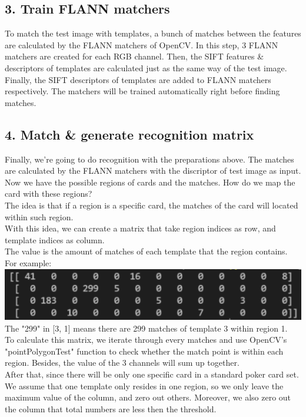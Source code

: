 \documentclass{article}
\begin{document}
\subsection*{3. Train FLANN matchers}

To match the test image with templates, a bunch of matches between the features are calculated by the FLANN matchers of OpenCV. In this step, 3 FLANN matchers are created for each RGB channel. Then, the SIFT features \& descriptors of templates are calculated just as the same way of the test image. Finally, the SIFT descriptors of templates are added to FLANN matchers respectively. The matchers will be trained automatically right before finding matches.

\subsection*{4. Match \& generate recognition matrix}

Finally, we're going to do recognition with the preparations above. The matches are calculated by the FLANN matchers with the discriptor of test image as input.\\
Now we have the possible regions of cards and the matches. How do we map the card with these regions?\\
The idea is that if a region is a specific card, the matches of the card will located within such region.\\
With this idea, we can create a matrix that take region indices as row, and template indices as column.\\
The value is the amount of matches of each template that the region contains.\\
For example:\\
\includegraphics{matrix.png}\\
The "299" in [3, 1] means there are 299 matches of template 3 within region 1.\\
To calculate this matrix, we iterate through every matches and use OpenCV's "pointPolygonTest" function to check whether the match point is within each region. Besides, the value of the 3 channels will sum up together.\\
After that, since there will be only one specific card in a standard poker card set. We assume that one template only resides in one region, so we only leave the maximum value of the column, and zero out others. Moreover, we also zero out the column that total numbers are less then the threshold.
\end{document}
